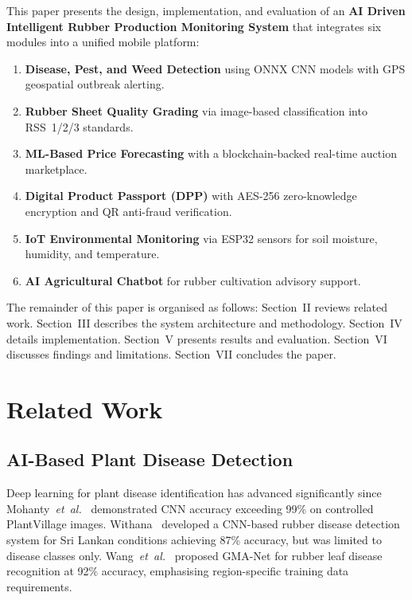 \documentclass[10pt, conference]{IEEEtran}
\begin{document}
This paper presents the design, implementation, and evaluation of an
\textbf{AI Driven Intelligent Rubber Production Monitoring System}
that integrates six modules into a unified mobile platform:

\begin{enumerate}
  \item \textbf{Disease, Pest, and Weed Detection} using ONNX CNN
        models with GPS geospatial outbreak alerting.
  \item \textbf{Rubber Sheet Quality Grading} via image-based
        classification into RSS~1/2/3 standards.
  \item \textbf{ML-Based Price Forecasting} with a blockchain-backed
        real-time auction marketplace.
  \item \textbf{Digital Product Passport (DPP)} with AES-256
        zero-knowledge encryption and QR anti-fraud verification.
  \item \textbf{IoT Environmental Monitoring} via ESP32 sensors for
        soil moisture, humidity, and temperature.
  \item \textbf{AI Agricultural Chatbot} for rubber cultivation
        advisory support.
\end{enumerate}

The remainder of this paper is organised as follows: Section~II
reviews related work. Section~III describes the system architecture
and methodology. Section~IV details implementation. Section~V presents
results and evaluation. Section~VI discusses findings and limitations.
Section~VII concludes the paper.

\section{Related Work}

\subsection{AI-Based Plant Disease Detection}

Deep learning for plant disease identification has advanced
significantly since Mohanty~\textit{et~al.}~\cite{mohanty2016}
demonstrated CNN accuracy exceeding 99\% on controlled PlantVillage
images. Withana~\cite{withana2023} developed a CNN-based rubber
disease detection system for Sri Lankan conditions achieving 87\%
accuracy, but was limited to disease classes only.
Wang~\textit{et~al.}~\cite{wang2022} proposed GMA-Net for rubber leaf
disease recognition at 92\% accuracy, emphasising region-specific
training data requirements.
\end{document}
